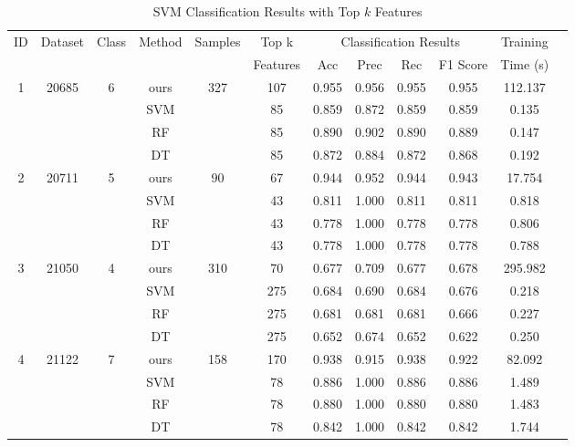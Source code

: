 \begin{table}[htbp]
  \centering
  \caption{SVM Classification Results with Top $k$ Features}
  \label{tab:svm_results}
  \scriptsize
  \begin{tabular}{cccccccccccc}
    \toprule
    ID & Dataset & Class & Method & Samples & \multicolumn{1}{c}{Top k} & \multicolumn{4}{c}{Classification Results} & {Training} \\
    \cmidrule(lr){7-10} 
        &         &       &         &   & Features & Acc & Prec & Rec & F1 Score & Time (s)  \\
  \midrule
        1  & 20685 & 6 & ours & 327 & 107 & 0.955 & 0.956 & 0.955 & 0.955 & 112.137 \\
           &       &   & SVM  &     & 85  & 0.859 & 0.872 & 0.859 & 0.859 & 0.135 \\
           &       &   & RF   &     & 85  & 0.890 & 0.902 & 0.890 & 0.889 & 0.147 \\
           &       &   & DT   &     & 85  & 0.872 & 0.884 & 0.872 & 0.868 & 0.192 \\
        \midrule
        2  & 20711 & 5 & ours & 90  & 67  & 0.944 & 0.952 & 0.944 & 0.943 & 17.754 \\
           &       &   & SVM  &     & 43  & 0.811 & 1.000 & 0.811 & 0.811 & 0.818 \\
           &       &   & RF   &     & 43  & 0.778 & 1.000 & 0.778 & 0.778 & 0.806 \\
           &       &   & DT   &     & 43  & 0.778 & 1.000 & 0.778 & 0.778 & 0.788 \\
        \midrule
        3  & 21050 & 4 & ours & 310 & 70  & 0.677 & 0.709 & 0.677 & 0.678 & 295.982\\
           &       &   & SVM  &     & 275 & 0.684 & 0.690 & 0.684 & 0.676 & 0.218 \\
           &       &   & RF   &     & 275 & 0.681 & 0.681 & 0.681 & 0.666 & 0.227 \\
           &       &   & DT   &     & 275 & 0.652 & 0.674 & 0.652 & 0.622 & 0.250 \\
        \midrule
        4  & 21122 & 7 & ours & 158 & 170 & 0.938 & 0.915 & 0.938 & 0.922 & 82.092 \\
           &       &   & SVM  &     & 78  & 0.886 & 1.000 & 0.886 & 0.886 & 1.489 \\
           &       &   & RF   &     & 78  & 0.880 & 1.000 & 0.880 & 0.880 & 1.483 \\
           &       &   & DT   &     & 78  & 0.842 & 1.000 & 0.842 & 0.842 & 1.744 \\

\end{tabular}
\end{table}
